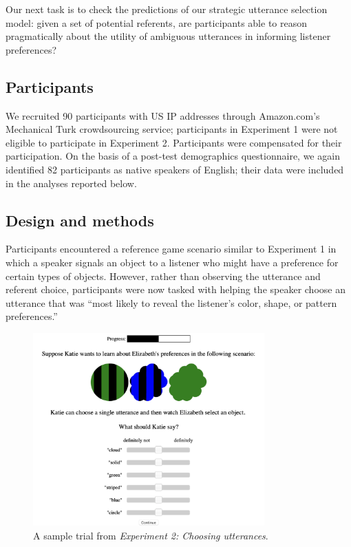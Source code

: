 \documentclass[10pt,a4paper]{article}
\begin{document}
Our next task is to check the predictions of our strategic utterance selection model: given a set of potential referents, are participants able to reason pragmatically about the utility of ambiguous utterances in informing listener preferences?

\subsection{Participants}

We recruited 90 participants with US IP addresses through Amazon.com's Mechanical Turk crowdsourcing service; participants in Experiment 1 were not eligible to participate in Experiment 2. Participants were compensated for their participation. On the basis of a post-test demographics questionnaire, we again identified  82 participants as native speakers of English; their data were included in the analyses reported below.

\subsection{Design and methods}

Participants encountered a reference game scenario similar to Experiment 1 in which a speaker signals an object to a listener who might have a preference for certain types of objects. However, rather than observing the utterance and referent choice, participants were now tasked with helping the speaker choose an utterance that was ``most likely to reveal the listener's color, shape, or pattern preferences.''

\begin{figure}[ht]
	\centering
	\includegraphics[width=3.5in]{images/utterance-choice-trial.png}
	\caption{A sample trial from \emph{Experiment 2: Choosing utterances}.}\label{exp2-trial}
\end{figure} 
\end{document}
